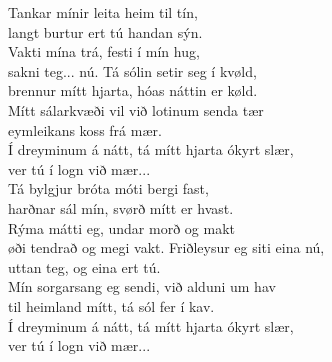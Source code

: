 Tankar mínir leita heim til tín, \\
langt burtur ert tú handan sýn.\\
Vakti mína trá, festi í mín hug,\tab{}\\
sakni teg... nú.\tab{}\tab{}
\hops
Tá sólin setir seg í kvøld,\tab{}\\
brennur mítt hjarta, hóas náttin er køld.\\
Mítt sálarkvæði vil við lotinum senda tær \\
eymleikans koss frá mær. \tab{}
\hops
{} {}\\
 Í dreyminum á nátt, tá mítt hjarta ókyrt slær, \\
 ver tú í logn við mær...\tab{}\tab{}\\
\hops
Tá bylgjur bróta móti bergi fast,\\
harðnar sál mín, svørð mítt er hvast.\\
Rýma mátti eg, undar morð og makt\\
øði tendrað og megi vakt.
\hops
Friðleysur eg siti eina nú,\\
uttan teg, og eina ert tú.\\
Mín sorgarsang eg sendi, við alduni um hav\\
til heimland mítt, tá sól fer í kav.
\hops
{} {}\\
 Í dreyminum á nátt, tá mítt hjarta ókyrt slær,\\
 ver tú í logn við mær...\\

\clearpage
{}

